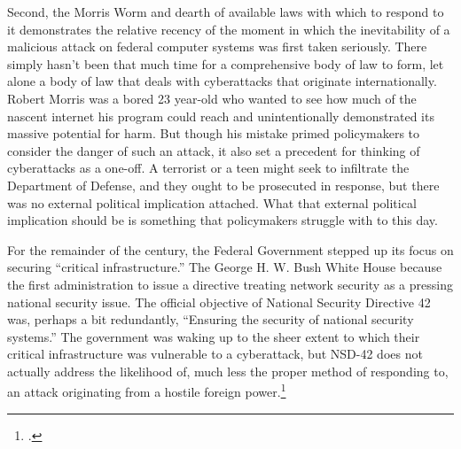 \documentclass{report}
\begin{document}
\begin{refsegment}
Second, the Morris Worm and dearth of available laws with which to respond to it demonstrates the relative recency of the moment in which the inevitability of a malicious attack on federal computer systems was first taken seriously. There simply hasn't been that much time for a comprehensive body of law to form, let alone a body of law that deals with cyberattacks that originate internationally. Robert Morris was a bored 23 year-old who wanted to see how much of the nascent internet his program could reach and unintentionally demonstrated its massive potential for harm. But though his mistake primed policymakers to consider the danger of such an attack, it also set a precedent for thinking of cyberattacks as a one-off. A terrorist or a teen might seek to infiltrate the Department of Defense, and they ought to be prosecuted in response, but there was no external political implication attached. What that external political implication should be is something that policymakers struggle with to this day.

For the remainder of the  century, the Federal Government stepped up its focus on securing ``critical infrastructure.'' The George H. W. Bush White House because the first administration to issue a directive treating network security as a pressing national security issue. The official objective of National Security Directive 42 was, perhaps a bit redundantly, ``Ensuring the security of national security systems.'' The government was waking up to the sheer extent to which their critical infrastructure was vulnerable to a cyberattack, but NSD-42 does not actually address the likelihood of, much less the proper method of responding to, an attack originating from a hostile foreign power.\footcite{bush_national_1990}


\end{refsegment}
\end{document}

